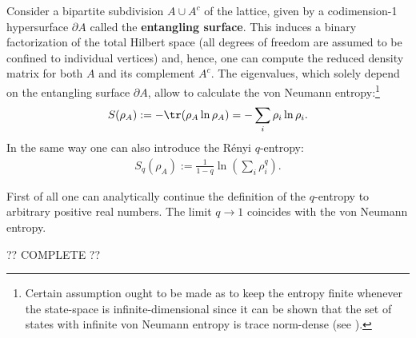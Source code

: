     Consider a bipartite subdivision $A\cup A^c$ of the lattice, given by a codimension-1 hypersurface $\partial A$ called the \textbf{entangling surface}. This induces a binary factorization of the total Hilbert space (all degrees of freedom are assumed to be confined to individual vertices) and, hence, one can compute the reduced density matrix for both $A$ and its complement $A^c$. The eigenvalues, which solely depend on the entangling surface $\partial A$, allow to calculate the von Neumann entropy:\footnote{Certain assumption ought to be made as to keep the entropy finite whenever the state-space is infinite-dimensional since it can be shown that the set of states with infinite von Neumann entropy is trace norm-dense (see \cite{Eisert_entropy}).}
    \begin{gather}
        S(\rho_A) := -\tr(\rho_A\ln\rho_A) = -\sum_i\rho_i\ln\rho_i.
    \end{gather}
    In the same way one can also introduce the R\'enyi $q$-entropy:
    \begin{gather}
        S_q(\rho_A) := \frac{1}{1-q}\ln\left(\sum_i\rho_i^q\right).
    \end{gather}
    \begin{property}
         First of all one can analytically continue the definition of the $q$-entropy to arbitrary positive real numbers. The limit $q\longrightarrow1$ coincides with the von Neumann entropy.
    \end{property}

    ?? COMPLETE ??